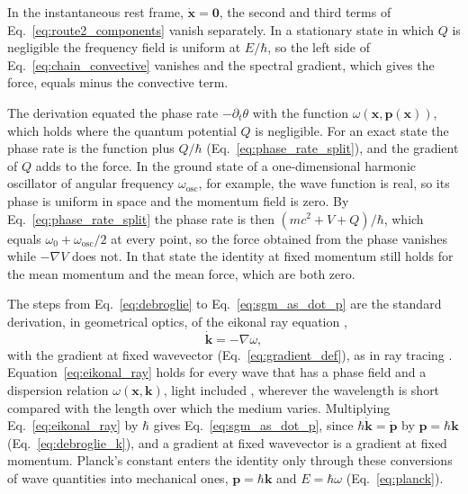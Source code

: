 \documentclass[aps,prd,onecolumn,tightenlines,nofootinbib,notitlepage,11pt,floatfix]{revtex4-2}
\theoremstyle{indentedtheorem}
\begin{document}
In the instantaneous rest frame, $\dot{\mathbf{x}}=\mathbf{0}$, the second and third terms of Eq.~\eqref{eq:route2_components} vanish separately. In a stationary state in which $Q$ is negligible the frequency field is uniform at $E/\hbar$, so the left side of Eq.~\eqref{eq:chain_convective} vanishes and the spectral gradient, which gives the force, equals minus the convective term.

The derivation equated the phase rate $-\partial_t\theta$ with the function $\omega(\mathbf{x},\mathbf{p}(\mathbf{x}))$, which holds where the quantum potential $Q$ is negligible. For an exact state the phase rate is the function plus $Q/\hbar$ (Eq.~\eqref{eq:phase_rate_split}), and the gradient of $Q$ adds to the force. In the ground state of a one-dimensional harmonic oscillator of angular frequency $\omega_\text{osc}$, for example, the wave function is real, so its phase is uniform in space and the momentum field is zero. By Eq.~\eqref{eq:phase_rate_split} the phase rate is then $(mc^2+V+Q)/\hbar$, which equals $\omega_0+\omega_\text{osc}/2$ at every point, so the force obtained from the phase vanishes while $-\nabla V$ does not. In that state the identity at fixed momentum still holds for the mean momentum and the mean force, which are both zero.

The steps from Eq.~\eqref{eq:debroglie} to Eq.~\eqref{eq:sgm_as_dot_p} are the standard derivation, in geometrical optics, of the eikonal ray equation \citep{Whitham1974Linear},
\begin{equation}
    \dot{\mathbf{k}} = -\nabla\omega ,
    \label{eq:eikonal_ray}
\end{equation}
with the gradient at fixed wavevector (Eq.~\eqref{eq:gradient_def}), as in ray tracing \citep{Dodin2009Langmuir}. Equation~\eqref{eq:eikonal_ray} holds for every wave that has a phase field and a dispersion relation $\omega(\mathbf{x},\mathbf{k})$, light included \citep{Evans1986Optics}, wherever the wavelength is short compared with the length over which the medium varies. Multiplying Eq.~\eqref{eq:eikonal_ray} by $\hbar$ gives Eq.~\eqref{eq:sgm_as_dot_p}, since $\hbar\dot{\mathbf{k}}=\dot{\mathbf{p}}$ by $\mathbf{p}=\hbar\mathbf{k}$ (Eq.~\eqref{eq:debroglie_k}), and a gradient at fixed wavevector is a gradient at fixed momentum. Planck's constant enters the identity only through these conversions of wave quantities into mechanical ones, $\mathbf{p}=\hbar\mathbf{k}$ and $E=\hbar\omega$ (Eq.~\eqref{eq:planck}).

\end{document}
